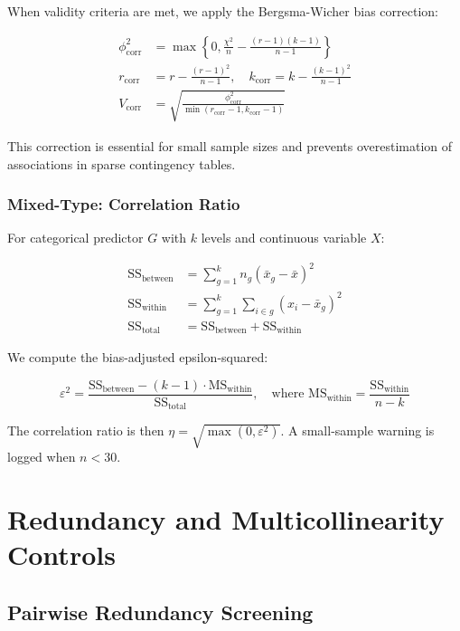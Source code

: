 When validity criteria are met, we apply the Bergsma-Wicher bias correction:

\begin{align}
\phi^2_{\text{corr}} &= \max\left\{0, \frac{\chi^2}{n} - \frac{(r-1)(k-1)}{n-1}\right\} \\
r_{\text{corr}} &= r - \frac{(r-1)^2}{n-1}, \quad k_{\text{corr}} = k - \frac{(k-1)^2}{n-1} \\
V_{\text{corr}} &= \sqrt{\frac{\phi^2_{\text{corr}}}{\min(r_{\text{corr}}-1, k_{\text{corr}}-1)}}
\label{eq:cramers-v}
\end{align}

This correction is essential for small sample sizes and prevents overestimation of associations in sparse contingency tables.

\subsubsection{Mixed-Type: Correlation Ratio}

For categorical predictor $G$ with $k$ levels and continuous variable $X$:

\begin{align}
\text{SS}_{\text{between}} &= \sum_{g=1}^{k} n_g(\bar{x}_g - \bar{x})^2 \\
\text{SS}_{\text{within}} &= \sum_{g=1}^{k} \sum_{i \in g} (x_i - \bar{x}_g)^2 \\
\text{SS}_{\text{total}} &= \text{SS}_{\text{between}} + \text{SS}_{\text{within}}
\end{align}

We compute the bias-adjusted epsilon-squared:

\begin{equation}
\varepsilon^2 = \frac{\text{SS}_{\text{between}} - (k-1) \cdot \text{MS}_{\text{within}}}{\text{SS}_{\text{total}}}, \quad \text{where } \text{MS}_{\text{within}} = \frac{\text{SS}_{\text{within}}}{n-k}
\label{eq:epsilon-squared}
\end{equation}

The correlation ratio is then $\eta = \sqrt{\max(0, \varepsilon^2)}$. A small-sample warning is logged when $n < 30$.

\section{Redundancy and Multicollinearity Controls}

\subsection{Pairwise Redundancy Screening}

